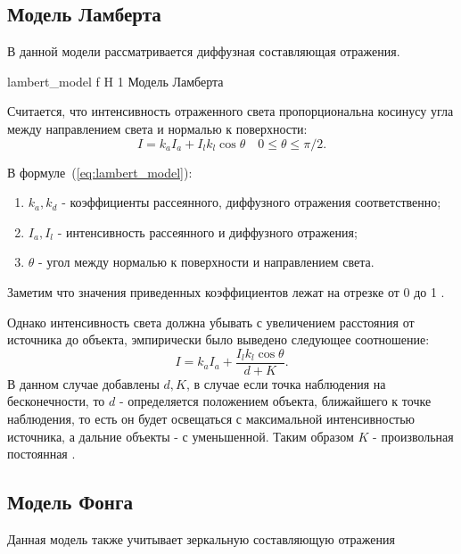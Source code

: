 \subsection{Модель Ламберта}
В данной модели рассматривается диффузная составляющая отражения.


{lambert_model} %
{f} %
{H} %
{1\textwidth} %
{Модель Ламберта} %



Считается, что интенсивность отраженного света
пропорциональна косинусу угла между направлением света и нормалью к поверхности:
\begin{equation} 
	I = k_aI_a + I_lk_l\cos\theta \quad 0 \leq \theta \leq \pi/2.
	\label{eq:lambert_model}
\end{equation}

В  формуле~(\ref{eq:lambert_model}):
\begin{enumerate}
	\item $k_a,k_d$ - коэффициенты рассеянного, диффузного отражения соответственно;
	\item $I_a,I_l$ - интенсивность рассеянного и диффузного отражения;
	\item $\theta$ - угол между нормалью к поверхности и направлением света.
\end{enumerate}
Заметим что значения приведенных коэффициентов лежат на отрезке от 0 до 1 \cite{Rodgers}.

Однако интенсивность света должна убывать с увеличением расстояния от источника до объекта, эмпирически было выведено следующее соотношение:
\begin{equation} 
	I = k_aI_a + \frac{I_lk_l\cos\theta}{d + K}.
	\label{eq:lambert_model_space}
\end{equation}
В данном случае добавлены $d,K$, в случае если точка наблюдения на бесконечности, то $d$ - определяется положением объекта,
ближайшего к точке наблюдения, то есть он будет освещаться с максимальной интенсивностью источника, а дальние объекты - с уменьшенной.
Таким образом $K$ - произвольная постоянная \cite{Rodgers}.


\subsection{Модель Фонга}
Данная модель также учитывает зеркальную составляющую отражения


